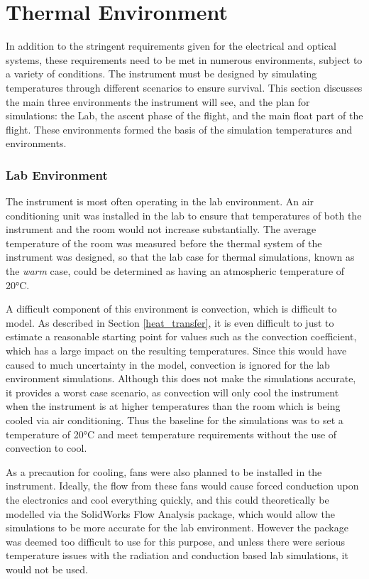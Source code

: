\section{Thermal Environment}\label{thermal_env_ch3_sec}
In addition to the stringent requirements given for the electrical and optical systems, these requirements need to be met in numerous environments, subject to a variety of conditions. The instrument must be designed by simulating temperatures through different scenarios to ensure survival. This section discusses the main three environments the instrument will see, and the plan for simulations: the Lab, the ascent phase of the flight, and the main float part of the flight. These environments formed the basis of the simulation temperatures and environments. 

\subsubsection{Lab Environment}
The instrument is most often operating in the lab environment. An air conditioning unit was installed in the lab to ensure that temperatures of both the instrument and the room would not increase substantially. The average temperature of the room was measured before the thermal system of the instrument was designed, so that the lab case for thermal simulations, known as the \textit{warm} case, could be determined as having an atmospheric temperature of 20°C.

A difficult component of this environment is convection, which is difficult to model. As described in Section \ref{heat_transfer}, it is even difficult to just to estimate a reasonable starting point for values such as the convection coefficient, which has a large impact on the resulting temperatures. Since this would have caused to much uncertainty in the model, convection is ignored for the lab environment simulations. Although this does not make the simulations accurate, it provides a worst case scenario, as convection will only cool the instrument when the instrument is at higher temperatures than the room which is being cooled via air conditioning. Thus the baseline for the simulations was to set a temperature of 20°C and meet temperature requirements without the use of convection to cool. 

As a precaution for cooling, fans were also planned to be installed in the instrument. Ideally, the flow from these fans would cause forced conduction upon the electronics and cool everything quickly, and this could theoretically be modelled via the SolidWorks Flow Analysis package, which would allow the simulations to be more accurate for the lab environment. However the package was deemed too difficult to use for this purpose, and unless there were serious temperature issues with the radiation and conduction based lab simulations, it would not be used.

